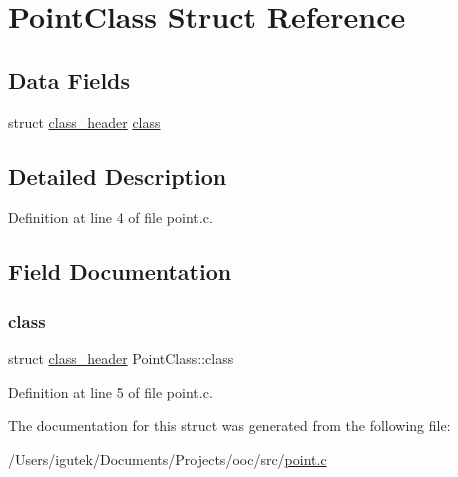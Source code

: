 \hypertarget{structPointClass}{}\section{Point\+Class Struct Reference}
\label{structPointClass}
\subsection*{Data Fields}
\begin{DoxyCompactItemize}
\item 
struct \mbox{\hyperlink{structclass__header}{class\+\_\+header}} \mbox{\hyperlink{structPointClass_a5cd748e94a0c1b180bdd11f423af212e}{class}}
\end{DoxyCompactItemize}


\subsection{Detailed Description}


Definition at line 4 of file point.\+c.



\subsection{Field Documentation}
\mbox{\label{structPointClass_a5cd748e94a0c1b180bdd11f423af212e}} 
\subsubsection{\texorpdfstring{class}{class}}
{\footnotesize\ttfamily struct \mbox{\hyperlink{structclass__header}{class\+\_\+header}} Point\+Class\+::class}



Definition at line 5 of file point.\+c.



The documentation for this struct was generated from the following file\+:\begin{DoxyCompactItemize}
\item 
/\+Users/igutek/\+Documents/\+Projects/ooc/src/\mbox{\hyperlink{point_8c}{point.\+c}}\end{DoxyCompactItemize}

